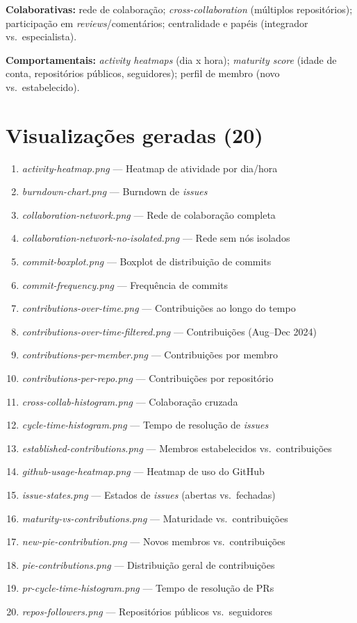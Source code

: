 \documentclass[
	12pt,
	openright,
	oneside,
	a4paper,
	brazil
]{abntex2}
\begin{document}
\begin{apendicesenv}
\noindent\textbf{Colaborativas:} rede de colaboração; \textit{cross-collaboration} (múltiplos repositórios); participação em \textit{reviews}/comentários; centralidade e papéis (integrador vs.\ especialista).

\noindent\textbf{Comportamentais:} \textit{activity heatmaps} (dia x hora); \textit{maturity score} (idade de conta, repositórios públicos, seguidores); perfil de membro (novo vs.\ estabelecido).

\section*{Visualizações geradas (20)}
\begin{enumerate}
    \item \textit{activity-heatmap.png} — Heatmap de atividade por dia/hora
    \item \textit{burndown-chart.png} — Burndown de \textit{issues}
    \item \textit{collaboration-network.png} — Rede de colaboração completa
    \item \textit{collaboration-network-no-isolated.png} — Rede sem nós isolados
    \item \textit{commit-boxplot.png} — Boxplot de distribuição de commits
    \item \textit{commit-frequency.png} — Frequência de commits
    \item \textit{contributions-over-time.png} — Contribuições ao longo do tempo
    \item \textit{contributions-over-time-filtered.png} — Contribuições (Aug--Dec 2024)
    \item \textit{contributions-per-member.png} — Contribuições por membro
    \item \textit{contributions-per-repo.png} — Contribuições por repositório
    \item \textit{cross-collab-histogram.png} — Colaboração cruzada
    \item \textit{cycle-time-histogram.png} — Tempo de resolução de \textit{issues}
    \item \textit{established-contributions.png} — Membros estabelecidos vs.\ contribuições
    \item \textit{github-usage-heatmap.png} — Heatmap de uso do GitHub
    \item \textit{issue-states.png} — Estados de \textit{issues} (abertas vs.\ fechadas)
    \item \textit{maturity-vs-contributions.png} — Maturidade vs.\ contribuições
    \item \textit{new-pie-contribution.png} — Novos membros vs.\ contribuições
    \item \textit{pie-contributions.png} — Distribuição geral de contribuições
    \item \textit{pr-cycle-time-histogram.png} — Tempo de resolução de PRs
    \item \textit{repos-followers.png} — Repositórios públicos vs.\ seguidores
\end{enumerate}


\end{apendicesenv}
\end{document}
